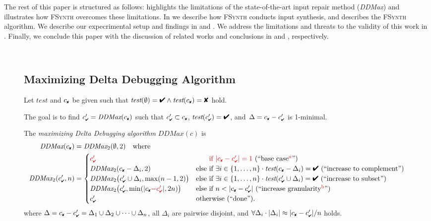 \documentclass[sigconf,review,anonymous]{acmart}
\newcounter{todocounter}
\newcommand{\todo}[1]{\marginpar{$|$}\textcolor{red}{\stepcounter{todocounter}\footnote[\thetodocounter]{\textcolor{red}{\textbf{TODO }}\textit{#1}}}}
\renewcommand{\todo}[1]{}
\newcommand{\test}{\textit{test}\xspace}
\newcommand{\pass}{\text{\ding{52}}\xspace}
\newcommand{\fail}{\text{\ding{56}}\xspace}
\newcommand{\cfail}{{c_{\scriptscriptstyle \fail}}}
\newcommand{\dpass}{{c'_{\scriptscriptstyle \pass}}}
\newcommand{\ddmax}{\textit{DDMax}\xspace}
\newcommand{\brepair}{\textsc{FSynth}\xspace}
\begin{document}
The rest of this paper is structured as follows:  highlights the limitations of the state-of-the-art input repair method (\ddmax) and illustrates how \brepair overcomes these limitations. In  we describe how \brepair conducts input synthesis, and   describes the \brepair algorithm. We describe our expecrimental setup and findings in  and . We address the limitations and threats to the validity of this work in 
. Finally, we conclude this paper with the discussion of related works and conclusions in  and , respectively.



\begin{figure*}[t]
\begin{boxedminipage}{\textwidth}
\smallskip
\ \begin{minipage}{0.9\textwidth}
\subsection*{Maximizing Delta Debugging Algorithm}
\medskip

Let $\test$ and $\cfail$ be given such that $\test(\emptyset) = \pass \land
\test(\cfail) = \fail$ hold.

The goal is to find $\dpass = \ddmax(\cfail)$ such that $\dpass \subset \cfail$, $\test(\dpass) = \pass$, and~$\Delta = \cfail - \dpass$ is 1-minimal.

The \emph{maximizing Delta Debugging algorithm} $\ddmax(c)$ is
\begin{align*}
\ddmax(\cfail) &= \ddmax_2(\emptyset, 2) \quad \text{where} \\
\ddmax_2(\dpass, n) &=
\begin{cases}
  \textcolor{red}{\dpass} & \text{\textcolor{red}{\hphantom{else }if $|\cfail - \dpass| = 1$} (``base case$^{\textcolor{red}{a}}$'')} \\
%
\ddmax_2(\cfail - \Delta_i, 2) & \text{else if $\exists i \in \{1, \dots, n\} \cdot \test(\cfail - \Delta_i) = \pass$ (``increase to complement'')} \\
%
\ddmax_2\bigl(\dpass \cup \Delta_i, \max(n - 1, 2)\bigr) &
\text{else if $\exists i \in \{1, \dots, n\} \cdot \test(\dpass \cup \Delta_i) = \pass$ (``increase to subset'')} \\
%
  \ddmax_2\bigl(\dpass, \min(|\cfail \textcolor{red}{- \dpass}|, 2n)\bigr) & \text{else if $n < |\cfail - \dpass|$ (``increase granularity$^{\text{\textcolor{red}{b}}}$'')} \\
\dpass & \text{otherwise (``done'').}
\end{cases}
\end{align*}
where $\Delta = \cfail - \dpass = \Delta_1 \cup \Delta_2 \cup \dots \cup \Delta_n$, all
$\Delta_i$ are pairwise disjoint, and $\forall \Delta_i \cdot |\Delta_i| \approx |\cfail - \dpass| / n$
holds.


\end{minipage}
\end{boxedminipage}
\end{figure*}
\end{document}
